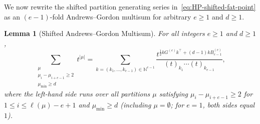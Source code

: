 \documentclass[a4paper, 12pt, reqno]{amsart}
\newtheorem{lemma}[theorem]{Lemma}
\theoremstyle{remark}
\begin{document}
We now rewrite the shifted partition generating series in~\eqref{eq:HP-shifted-fat-point} as an $(e - 1)$-fold Andrews--Gordon multisum for arbitrary $e \ge 1$ and $d \ge 1$.

\begin{lemma}[Shifted Andrews--Gordon Multisum]
  \label{lem:shifted-ag-multisum}
  For all integers $e \ge 1$ and $d \ge 1$,
  \begin{equation}
    \label{eq:shifted-ag-multisum}
    \sum_{\substack{\mu \\ \mu_i - \mu_{i + e - 1} \ge 2 \\ \mu_{\mathrm{min}} \ge d}} t^{|\mu|}
    = \sum_{k = (k_1, \dots, k_{e - 1}) \in \mathbb{N}^{e - 1}} \frac{t^{\frac{1}{2}kG^{(e)}k^\top + (d - 1)kB^{(e)}_{e - 1}}}{(t)_{k_1} \cdots (t)_{k_{e - 1}}},
  \end{equation}
  where the left-hand side runs over all partitions $\mu$ satisfying $\mu_i - \mu_{i + e - 1} \ge 2$ for $1 \le i \le \ell(\mu) - e + 1$ and $\mu_{\mathrm{min}} \ge d$
  (including $\mu = \emptyset$;
  for $e = 1$, both sides equal $1$).
\end{lemma}
\end{document}
